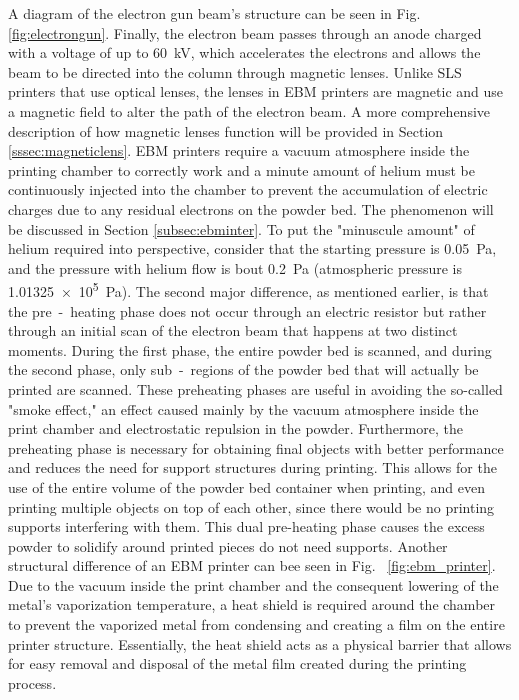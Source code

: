 A diagram of the electron gun beam's structure can be seen in Fig. \ref{fig:electrongun}. Finally, the electron beam passes through an anode charged with a voltage of up to \SI{60}{\kilo\volt}, which accelerates the electrons and allows the beam to be directed into the column through magnetic lenses. Unlike SLS printers that use optical lenses, the lenses in EBM printers are magnetic and use a magnetic field to alter the path of the electron beam. A more comprehensive description of how magnetic lenses function will be provided in Section \ref{sssec:magneticlens}. EBM printers require a vacuum atmosphere inside the printing chamber to correctly work and a minute amount of helium must be continuously injected into the chamber to prevent the accumulation of electric charges due to any residual electrons on the powder bed. The phenomenon will be discussed in Section \ref{subsec:ebminter}. To put the "minuscule amount" of helium required into perspective, consider that the starting pressure is \SI{0,05}{\pascal}, and the pressure with helium flow is bout \SI{0,2}{\pascal} (atmospheric pressure is \SI{1,01325e5}{\pascal}). The second major difference, as mentioned earlier, is that the pre~-~heating phase does not occur through an electric resistor but rather through an initial scan of the electron beam that happens at two distinct moments. During the first phase, the entire powder bed is scanned, and during the second phase, only sub~-~regions of the powder bed that will actually be printed are scanned. These preheating phases are useful in avoiding the so-called "smoke effect," an effect caused mainly by the vacuum atmosphere inside the print chamber and electrostatic repulsion in the powder. Furthermore, the preheating phase is necessary for obtaining final objects with better performance and reduces the need for support structures during printing. This allows for the use of the entire volume of the powder bed container when printing, and even printing multiple objects on top of each other, since there would be no printing supports interfering with them. This dual pre-heating phase causes the excess powder to solidify around printed pieces do not need supports. Another structural difference of an EBM printer can bee seen in Fig. ~\ref{fig:ebm_printer}. Due to the vacuum inside the print chamber and the consequent lowering of the metal's vaporization temperature, a heat shield is required around the chamber to prevent the vaporized metal from condensing and creating a film on the entire printer structure. Essentially, the heat shield acts as a physical barrier that allows for easy removal and disposal of the metal film created during the printing process.
